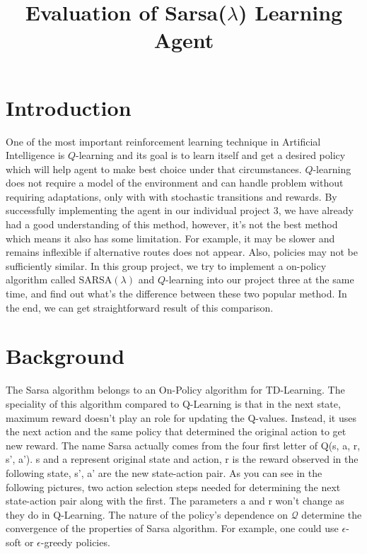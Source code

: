 \documentclass[10pt,conference]{IEEEtran}
\title{
	Evaluation of Sarsa(\(\lambda\)) Learning Agent 
	}
\author{
	\IEEEauthorblockN{Padraic Cashin \IEEEauthorrefmark{1}, 
	        Ruihao Zhou \IEEEauthorrefmark{2}
		David Lahtinen \IEEEauthorrefmark{3}, 
		Zubin Kapadia \IEEEauthorrefmark{4},
	}
	\IEEEauthorblockA{
		\IEEEauthorrefmark{1} ASU ID: 1214153888 \\
		\IEEEauthorrefmark{2} ASU ID: 1213439264 \\
		\IEEEauthorrefmark{3} ASU ID: 1207725034 \\
		\IEEEauthorrefmark{4} ASU ID: 1213238024 \\
	}
}
\begin{document}
\maketitle

\section{Introduction}

One of the most important reinforcement learning technique in Artificial 
Intelligence is \(Q\)-learning and its goal is to learn itself and get a 
desired policy which will help agent to make best choice under that 
circumstances. \(Q\)-learning does not require a model of the environment and 
can handle problem without requiring adaptations, only with with stochastic 
transitions and rewards. By successfully implementing the agent in our individual project 
3, we have already had a good understanding of this method, however, it’s not 
the best method which means it also has some limitation. For example, it may 
be slower and remains inflexible if alternative routes does not appear. Also, 
policies may not be sufficiently similar. In this group project, we try to 
implement a on-policy algorithm called SARSA\((\lambda)\) and \(Q\)-learning 
into our project three at the same time, and find out what’s the difference 
between these two popular method. In the end, we can get straightforward 
result of this comparison. 

\label{sec:intro}

\section{Background}
\label{sec:background}
	
	The Sarsa algorithm belongs to an On-Policy algorithm for TD-Learning. The 
	speciality of this algorithm compared to Q-Learning is that in the next 
	state, maximum reward doesn’t play an role for updating the Q-values. 
	Instead, it uses the next action and the same policy that determined the 
	original action to get new reward. The name Sarsa actually comes from the 
	four first letter of Q(s, a, r, s', a'). s and a represent original state 
	and action, r is the reward observed in the following state, s', a' are 
	the new state-action pair. As you can see in the following pictures, two 
	action selection steps needed for determining the next state-action pair 
	along with the first. The parameters a and r won’t change as they do in 
	Q-Learning. The nature of the policy's dependence on \(\mathcal{Q}\) determine 
	the convergence of the properties of Sarsa algorithm. For example, one 
	could use \(\epsilon\)-soft or \(\epsilon\)-greedy policies. \cite{sutton18} 
	
\end{document}
